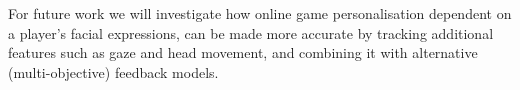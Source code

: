 \documentclass[letterpaper]{article}
\begin{document}
For future work we will investigate how online game personalisation dependent on a player's facial expressions, can be made more accurate by tracking additional features such as gaze and head movement, and combining it with alternative (multi-objective) feedback models. %






\clearpage

\begin{spacing}{0.95}
	\begin{footnotesize}
	
	
	\end{footnotesize}
\end{spacing}
\end{document}

